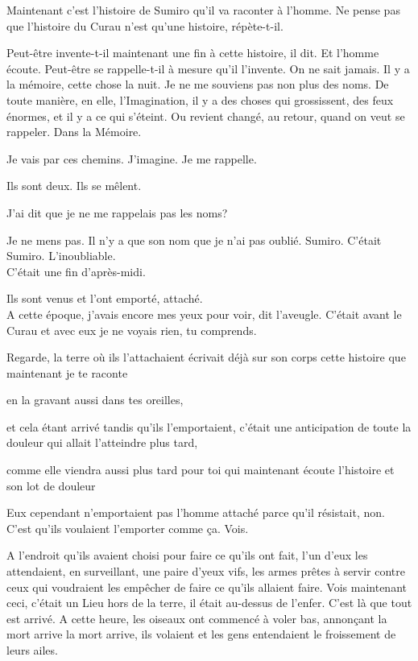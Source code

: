 Maintenant c'est l'histoire de Sumiro qu'il va raconter à l'homme. Ne
pense pas que l'histoire du Curau n'est qu'une histoire, répète-t-il.

Peut-être invente-t-il maintenant une fin à cette histoire, il dit. Et
l'homme écoute. Peut-être se rappelle-t-il à mesure qu'il l'invente. On
ne sait jamais. Il y a la mémoire, cette chose la nuit. Je ne me
souviens pas non plus des noms. De toute manière, en elle,
l'Imagination, il y a des choses qui grossissent, des feux énormes, et
il y a ce qui s'éteint. Ou revient changé, au retour, quand on veut se
rappeler. Dans la Mémoire.

Je vais par ces chemins. J'imagine. Je me rappelle.

Ils sont deux. Ils se mêlent.

J'ai dit que je ne me rappelais pas les noms?

Je ne mens pas. Il n'y a que son nom que je n'ai pas oublié. Sumiro.
C'était Sumiro. L'inoubliable.\\

C'était une fin d'après-midi.

Ils sont venus et l'ont emporté, attaché.\\

A cette époque, j'avais encore mes yeux pour voir, dit l'aveugle.
C'était avant le Curau et avec eux je ne voyais rien, tu comprends.

Regarde, la terre où ils l'attachaient écrivait déjà sur son corps cette
histoire que maintenant je te raconte

en la gravant aussi dans tes oreilles,

et cela étant arrivé tandis qu'ils l'emportaient, c'était une
anticipation de toute la douleur qui allait l'atteindre plus tard,

comme elle viendra aussi plus tard pour toi qui maintenant écoute
l'histoire et son lot de douleur

Eux cependant n'emportaient pas l'homme attaché parce qu'il résistait,
non. C'est qu'ils voulaient l'emporter comme ça. Vois.

A l'endroit qu'ils avaient choisi pour faire ce qu'ils ont fait, l'un
d'eux les attendaient, en surveillant, une paire d'yeux vifs, les armes
prêtes à servir contre ceux qui voudraient les empêcher de faire ce
qu'ils allaient faire. Vois maintenant ceci, c'était un Lieu hors de la
terre, il était au-dessus de l'enfer. C'est là que tout est arrivé. A
cette heure, les oiseaux ont commencé à voler bas, annonçant la mort
arrive la mort arrive, ils volaient et les gens entendaient le
froissement de leurs ailes.

